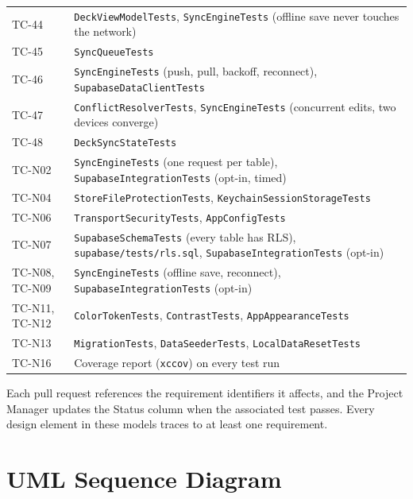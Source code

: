 \documentclass[12pt,letterpaper]{article}
\begin{document}
\begin{xltabular}{\textwidth}{@{}L{2.4cm} Y@{}}
TC-44 & \texttt{DeckViewModelTests}, \texttt{SyncEngineTests} (offline save never touches the network) \\
TC-45 & \texttt{SyncQueueTests} \\
TC-46 & \texttt{SyncEngineTests} (push, pull, backoff, reconnect), \texttt{SupabaseDataClientTests} \\
TC-47 & \texttt{ConflictResolverTests}, \texttt{SyncEngineTests} (concurrent edits, two devices converge) \\
TC-48 & \texttt{DeckSyncStateTests} \\
TC-N02 & \texttt{SyncEngineTests} (one request per table), \texttt{SupabaseIntegrationTests} (opt-in, timed) \\
TC-N04 & \texttt{StoreFileProtectionTests}, \texttt{KeychainSessionStorageTests} \\
TC-N06 & \texttt{TransportSecurityTests}, \texttt{AppConfigTests} \\
TC-N07 & \texttt{SupabaseSchemaTests} (every table has RLS), \texttt{supabase/tests/rls.sql}, \texttt{SupabaseIntegrationTests} (opt-in) \\
TC-N08, TC-N09 & \texttt{SyncEngineTests} (offline save, reconnect), \texttt{SupabaseIntegrationTests} (opt-in) \\
TC-N11, TC-N12 & \texttt{ColorTokenTests}, \texttt{ContrastTests}, \texttt{AppAppearanceTests} \\
TC-N13 & \texttt{MigrationTests}, \texttt{DataSeederTests}, \texttt{LocalDataResetTests} \\
TC-N16 & Coverage report (\texttt{xccov}) on every test run \\
\end{xltabular}

Each pull request references the requirement identifiers it affects, and the Project
Manager updates the Status column when the associated test passes. Every design element
in these models traces to at least one requirement.

\section{UML Sequence Diagram}
\end{document}
